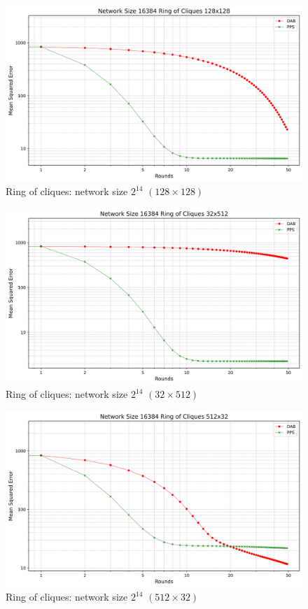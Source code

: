 \begin{figure}[H]
    \centering
    \includegraphics[scale=0.5]{figures/ringOfCliquesSimulations/128x128/DAB_vs_PPS_RoC_r50_n16384.png}
    \caption{Ring of cliques: network size $2^{14}$ $(128\times128)$}
    \label{fig:128x128ringOfCliques}
\end{figure}

\begin{figure}[H]
    \centering
    \includegraphics[scale=0.5]{figures/ringOfCliquesSimulations/32x512/DAB_vs_PPS_RoC_r50_n16384.png}
    \caption{Ring of cliques: network size $2^{14}$ $(32\times512)$}
    \label{fig:32x512ringOfCliques}
\end{figure}

\begin{figure}[H]
    \centering
    \includegraphics[scale=0.5]{figures/ringOfCliquesSimulations/512x32/DAB_vs_PPS_RoC_r50_n16384.png}
    \caption{Ring of cliques: network size $2^{14}$ $(512\times32)$}
    \label{fig:512x32ringOfCliques}
\end{figure}

